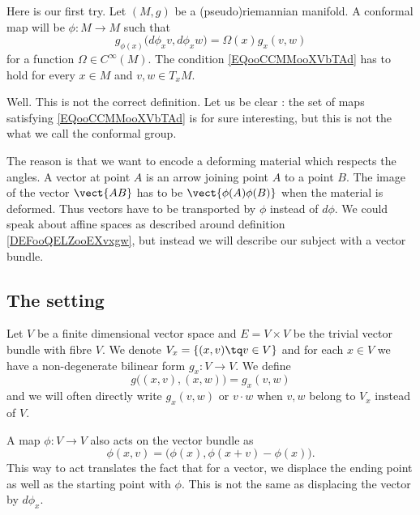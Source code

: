 Here is our first try. Let \( (M,g)\) be a (pseudo)riemannian manifold. A conformal map will be \( \phi\colon M\to M\) such that
\begin{equation}        \label{EQooCCMMooXVbTAd}
    g_{\phi(x)}\big( d\phi_xv,d\phi_xw \big)=\Omega(x)g_x(v,w)
\end{equation}
for a function \( \Omega\in C^{\infty}(M)\). The condition \eqref{EQooCCMMooXVbTAd} has to hold for every \( x\in M\) and \( v,w\in T_xM\).

Well. This is not the correct definition. Let us be clear : the set of maps satisfying \eqref{EQooCCMMooXVbTAd} is for sure interesting, but this is not the what we call the conformal group.

The reason is that we want to encode a deforming material which respects the angles. A vector at point \( A\) is an arrow joining point \( A\) to a point \( B\). The image of the vector \( \vect{ AB }\) has to be \( \vect{ \phi(A)\phi(B) }\) when the material is deformed. Thus vectors have to be transported by \( \phi\) instead of \( d\phi\). We could speak about affine spaces as described around definition \ref{DEFooQELZooEXvxgw}, but instead we will describe our subject with a vector bundle.

\subsection{The setting}

Let \( V\) be a finite dimensional vector space and \( E=V\times V\) be the trivial vector bundle with fibre \( V\). We denote \( V_x=\{ (x,v)\tq v\in V \}\) and for each \( x\in V\) we have a non-degenerate bilinear form \( g_x\colon V\to V\). We define
\begin{equation}
    g\big( (x,v),(x,w) \big)=g_x(v,w)
\end{equation}
and we will often directly write \( g_x(v,w)\) or \( v\cdot w\) when \( v,w\) belong to \(V_x\) instead of \( V\).

A map \( \phi\colon V\to V\) also acts on the vector bundle as
\begin{equation}
    \phi(x,v)=\big( \phi(x),\phi(x+v)-\phi(x) \big).
\end{equation}
This way to act translates the fact that for a vector, we displace the ending point as well as the starting point with \( \phi\). This is not the same as displacing the vector by \( d\phi_x\).

